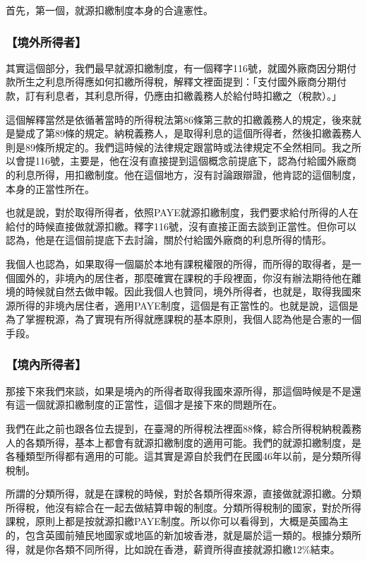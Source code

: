 \documentclass[oneside,sub3section]{ctexbook}
\begin{document}
首先，第一個，就源扣繳制度本身的合違憲性。

\hypertarget{ux5883ux5916ux6240ux5f97ux8005}{%
\subsubsection{【境外所得者】}\label{ux5883ux5916ux6240ux5f97ux8005}}

其實這個部分，我們最早就源扣繳制度，有一個釋字116號，就國外廠商因分期付款所生之利息所得應如何扣繳所得稅，解釋文裡面提到：「支付國外廠商分期付款，訂有利息者，其利息所得，仍應由扣繳義務人於給付時扣繳之（稅款）。」

這個解釋當然是依循著當時的所得稅法第86條第三款的扣繳義務人的規定，後來就是變成了第89條的規定。納稅義務人，是取得利息的這個所得者，然後扣繳義務人則是89條所規定的。我們這時候的法律規定跟當時或法律規定不全然相同。我之所以會提116號，主要是，他在沒有直接提到這個概念前提底下，認為付給國外廠商的利息所得，用扣繳制度。他在這個地方，沒有討論跟辯證，他肯認的這個制度，本身的正當性所在。

也就是說，對於取得所得者，依照PAYE就源扣繳制度，我們要求給付所得的人在給付的時候直接做就源扣繳。釋字116號，沒有直接正面去談到正當性。但你可以認為，他是在這個前提底下去討論，關於付給國外廠商的利息所得的情形。

我個人也認為，如果取得一個屬於本地有課稅權限的所得，而所得的取得者，是一個國外的，非境內的居住者，那麼確實在課稅的手段裡面，你沒有辦法期待他在離境的時候就自然去做申報。因此我個人也贊同，境外所得者，也就是，取得我國來源所得的非境內居住者，適用PAYE制度，這個是有正當性的。也就是說，這個是為了掌握稅源，為了實現有所得就應課稅的基本原則，我個人認為他是合憲的一個手段。

\hypertarget{ux5883ux5167ux6240ux5f97ux8005}{%
\subsubsection{【境內所得者】}\label{ux5883ux5167ux6240ux5f97ux8005}}

那接下來我們來談，如果是境內的所得者取得我國來源所得，那這個時候是不是還有這一個就源扣繳制度的正當性，這個才是接下來的問題所在。

我們在此之前也跟各位去提到，在臺灣的所得稅法裡面88條，綜合所得稅納稅義務人的各類所得，基本上都會有就源扣繳制度的適用可能。我們的就源扣繳制度，是各種類型所得都有適用的可能。這其實是源自於我們在民國46年以前，是分類所得稅制。

所謂的分類所得，就是在課稅的時候，對於各類所得來源，直接做就源扣繳。分類所得稅，他沒有綜合在一起去做結算申報的制度。分類所得稅制的國家，對於所得課稅，原則上都是按就源扣繳PAYE制度。所以你可以看得到，大概是英國為主的，包含英國前殖民地國家或地區的新加坡香港，就是屬於這一類的。根據分類所得，就是你各類不同所得，比如說在香港，薪資所得直接就源扣繳12\%結束。
\end{document}
